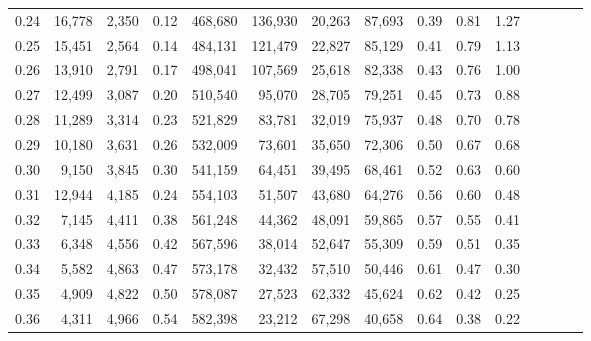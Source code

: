 \begin{tabular}{rrrcrrrrrrrrrrr}
0.24 &  16,778 &  2,350 &                                       0.12 &  468,680 &  136,930 &   20,263 &   87,693 &  0.39 &  0.81 &                         1.27 \\
0.25 &  15,451 &  2,564 &                                       0.14 &  484,131 &  121,479 &   22,827 &   85,129 &  0.41 &  0.79 &                         1.13 \\
0.26 &  13,910 &  2,791 &                                       0.17 &  498,041 &  107,569 &   25,618 &   82,338 &  0.43 &  0.76 &                         1.00 \\
0.27 &  12,499 &  3,087 &                                       0.20 &  510,540 &   95,070 &   28,705 &   79,251 &  0.45 &  0.73 &                         0.88 \\
0.28 &  11,289 &  3,314 &                                       0.23 &  521,829 &   83,781 &   32,019 &   75,937 &  0.48 &  0.70 &                         0.78 \\
0.29 &  10,180 &  3,631 &                                       0.26 &  532,009 &   73,601 &   35,650 &   72,306 &  0.50 &  0.67 &                         0.68 \\
0.30 &   9,150 &  3,845 &                                       0.30 &  541,159 &   64,451 &   39,495 &   68,461 &  0.52 &  0.63 &                         0.60 \\
0.31 &  12,944 &  4,185 &                                       0.24 &  554,103 &   51,507 &   43,680 &   64,276 &  0.56 &  0.60 &                         0.48 \\
0.32 &   7,145 &  4,411 &                                       0.38 &  561,248 &   44,362 &   48,091 &   59,865 &  0.57 &  0.55 &                         0.41 \\
0.33 &   6,348 &  4,556 &                                       0.42 &  567,596 &   38,014 &   52,647 &   55,309 &  0.59 &  0.51 &                         0.35 \\
0.34 &   5,582 &  4,863 &                                       0.47 &  573,178 &   32,432 &   57,510 &   50,446 &  0.61 &  0.47 &                         0.30 \\
0.35 &   4,909 &  4,822 &                                       0.50 &  578,087 &   27,523 &   62,332 &   45,624 &  0.62 &  0.42 &                         0.25 \\
0.36 &   4,311 &  4,966 &                                       0.54 &  582,398 &   23,212 &   67,298 &   40,658 &  0.64 &  0.38 &                         0.22 \\

\end{tabular}
